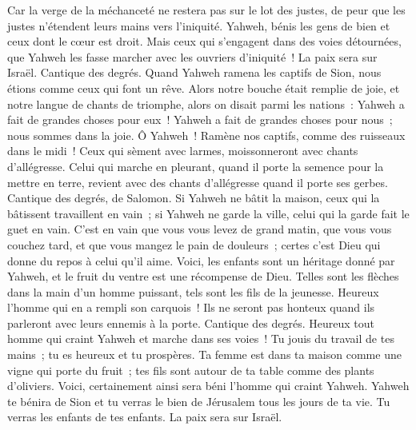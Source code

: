 \begin{multicols}{2}
Car la verge de la méchanceté ne restera pas sur le lot des justes, de peur que les justes n'étendent leurs mains vers l'iniquité.
Yahweh, bénis les gens de bien et ceux dont le cœur est droit.
Mais ceux qui s'engagent dans des voies détournées, que Yahweh les fasse marcher avec les ouvriers d'iniquité~! La paix sera sur Israël.
\VerseOne{}Cantique des degrés. Quand Yahweh ramena les captifs de Sion, nous étions comme ceux qui font un rêve.
Alors notre bouche était remplie de joie, et notre langue de chants de triomphe, alors on disait parmi les nations~: Yahweh a fait de grandes choses pour eux~!
Yahweh a fait de grandes choses pour nous~; nous sommes dans la joie.
Ô Yahweh~! Ramène nos captifs, comme des ruisseaux dans le midi~!
Ceux qui sèment avec larmes, moissonneront avec chants d'allégresse.
Celui qui marche en pleurant, quand il porte la semence pour la mettre en terre, revient avec des chants d'allégresse quand il porte ses gerbes.
\VerseOne{}Cantique des degrés, de Salomon. Si Yahweh ne bâtit la maison, ceux qui la bâtissent travaillent en vain~; si Yahweh ne garde la ville, celui qui la garde fait le guet en vain.
C'est en vain que vous vous levez de grand matin, que vous vous couchez tard, et que vous mangez le pain de douleurs~; certes c'est Dieu qui donne du repos à celui qu'il aime.
Voici, les enfants sont un héritage donné par Yahweh, et le fruit du ventre est une récompense de Dieu.
Telles sont les flèches dans la main d'un homme puissant, tels sont les fils de la jeunesse.
Heureux l'homme qui en a rempli son carquois~! Ils ne seront pas honteux quand ils parleront avec leurs ennemis à la porte.
\VerseOne{}Cantique des degrés. Heureux tout homme qui craint Yahweh et marche dans ses voies~!
Tu jouis du travail de tes mains~; tu es heureux et tu prospères.
Ta femme est dans ta maison comme une vigne qui porte du fruit~; tes fils sont autour de ta table comme des plants d'oliviers.
Voici, certainement ainsi sera béni l'homme qui craint Yahweh.
Yahweh te bénira de Sion et tu verras le bien de Jérusalem tous les jours de ta vie.
Tu verras les enfants de tes enfants. La paix sera sur Israël.

\end{multicols}
